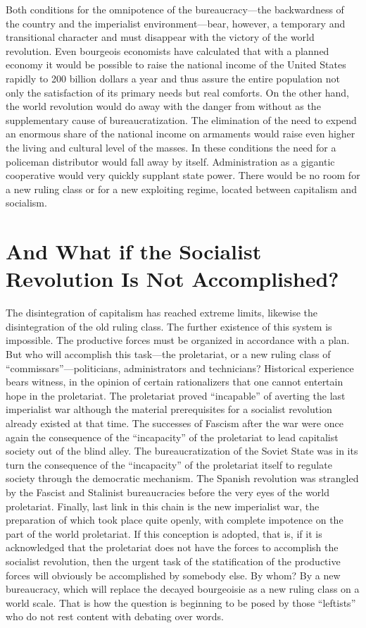 Both conditions for the omnipotence of the bureaucracy---the backwardness of the country and the imperialist environment---bear, however, a temporary and transitional character and must disappear with the victory of the world revolution. Even bourgeois economists have calculated that with a planned economy it would be possible to raise the national income of the United States rapidly to 200 billion dollars a year and thus assure the entire population not only the satisfaction of its primary needs but real comforts. On the other hand, the world revolution would do away with the danger from without as the supplementary cause of bureaucratization. The elimination of the need to expend an enormous share of the national income on armaments would raise even higher the living and cultural level of the masses. In these conditions the need for a policeman distributor would fall away by itself. Administration as a gigantic cooperative would very quickly supplant state power. There would be no room for a new ruling class or for a new exploiting regime, located between capitalism and socialism.

\section*{And What if the Socialist Revolution Is Not Accomplished?}

The disintegration of capitalism has reached extreme limits, likewise the disintegration of the old ruling class. The further existence of this system is impossible. The productive forces must be organized in accordance with a plan. But who will accomplish this task---the proletariat, or a new ruling class of “commissars”---politicians, administrators and technicians? Historical experience bears witness, in the opinion of certain rationalizers that one cannot entertain hope in the proletariat. The proletariat proved “incapable” of averting the last imperialist war although the material prerequisites for a socialist revolution already existed at that time. The successes of Fascism after the war were once again the consequence of the “incapacity” of the proletariat to lead capitalist society out of the blind alley. The bureaucratization of the Soviet State was in its turn the consequence of the “incapacity” of the proletariat itself to regulate society through the democratic mechanism. The Spanish revolution was strangled by the Fascist and Stalinist bureaucracies before the very eyes of the world proletariat. Finally, last link in this chain is the new imperialist war, the preparation of which took place quite openly, with complete impotence on the part of the world proletariat. If this conception is adopted, that is, if it is acknowledged that the proletariat does not have the forces to accomplish the socialist revolution, then the urgent task of the statification of the productive forces will obviously be accomplished by somebody else. By whom? By a new bureaucracy, which will replace the decayed bourgeoisie as a new ruling class on a world scale. That is how the question is beginning to be posed by those “leftists” who do not rest content with debating over words.

